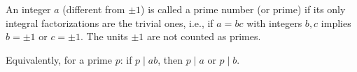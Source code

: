 An integer $a$ (different from $\pm 1$) is called a prime number (or prime) if its only integral factorizations are the trivial ones, i.e., if $a = bc$ with integers $b, c$ implies $b = \pm 1$ or $c = \pm 1$. The units $\pm 1$ are not counted as primes.

Equivalently, for a prime $p$: if $p \mid ab$, then $p \mid a$ or $p \mid b$.
